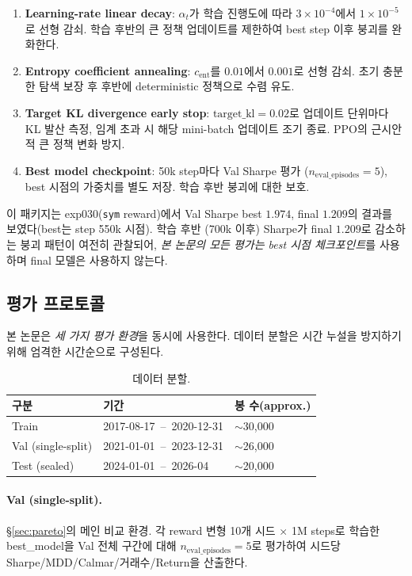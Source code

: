 \documentclass[11pt, a4paper]{article}
\begin{document}
\begin{enumerate}[leftmargin=*]
\item \textbf{Learning-rate linear decay}: $\alpha_t$가 학습 진행도에 따라
$3 \times 10^{-4}$에서 $1 \times 10^{-5}$로 선형 감쇠. 학습 후반의 큰 정책 업데이트를
제한하여 best step 이후 붕괴를 완화한다.
\item \textbf{Entropy coefficient annealing}: $c_{\text{ent}}$를 $0.01$에서 $0.001$로
선형 감쇠. 초기 충분한 탐색 보장 후 후반에 deterministic 정책으로 수렴 유도.
\item \textbf{Target KL divergence early stop}: $\text{target\_kl}=0.02$로 업데이트
단위마다 KL 발산 측정, 임계 초과 시 해당 mini-batch 업데이트 조기 종료. PPO의
근시안적 큰 정책 변화 방지.
\item \textbf{Best model checkpoint}: 50k step마다 Val Sharpe 평가
($n_{\text{eval\_episodes}}=5$), best 시점의 가중치를 별도 저장. 학습 후반 붕괴에 대한
보호.
\end{enumerate}

이 패키지는 exp030(\texttt{sym} reward)에서 Val Sharpe best $1.974$, final $1.209$의
결과를 보였다(best는 step 550k 시점). 학습 후반 (700k 이후) Sharpe가 final $1.209$로
감소하는 붕괴 패턴이 여전히 관찰되어, \emph{본 논문의 모든 평가는 best 시점
체크포인트}를 사용하며 final 모델은 사용하지 않는다.

\subsection{평가 프로토콜}
\label{sec:eval_protocol}

본 논문은 \emph{세 가지 평가 환경}을 동시에 사용한다. 데이터 분할은 시간 누설을
방지하기 위해 엄격한 시간순으로 구성된다.

\begin{table}[!htbp]
\centering
\caption{데이터 분할.}
\begin{tabular}{lll}
\toprule
구분 & 기간 & 봉 수(approx.) \\
\midrule
Train & 2017-08-17 \,--\, 2020-12-31 & $\sim$30{,}000 \\
Val (single-split) & 2021-01-01 \,--\, 2023-12-31 & $\sim$26{,}000 \\
Test (sealed) & 2024-01-01 \,--\, 2026-04 & $\sim$20{,}000 \\
\bottomrule
\end{tabular}
\label{tab:data_split}
\end{table}

\paragraph{Val (single-split).}
\S\ref{sec:pareto}의 메인 비교 환경. 각 reward 변형 10개 시드 $\times$ 1M steps로
학습한 best\_model을 Val 전체 구간에 대해 $n_{\text{eval\_episodes}}=5$로 평가하여
시드당 Sharpe/MDD/Calmar/거래수/Return을 산출한다.
\end{document}
